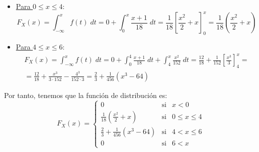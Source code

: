 \begin{ejercicio}
\begin{itemize}
        \item \underline{Para $0\leq x\leq 4$}:
        \begin{equation*}
            F_X(x) = \int_{-\infty}^x f(t)\;dt = 0 +\int_{0}^x \frac{x+1}{18}\;dt = \frac{1}{18}\left[\frac{x^2}{2}+x\right]_0^x
            = \frac{1}{18}\left(\frac{x^2}{2}+x\right)
        \end{equation*}

        \item \underline{Para $4\leq x\leq 6$}:
        \begin{multline*}
            F_X(x) = \int_{-\infty}^x f(t)\;dt = 0 +\int_{0}^4 \frac{x+1}{18}\;dt + 
            \int_{4}^x \frac{x^2}{152}\;dt
            = \frac{12}{18} + \frac{1}{152} \left[\frac{x^3}{3}\right]_4^x
            =\\= \frac{12}{18} + \frac{x^3}{3\cdot 152} - \frac{4^3}{152\cdot 3}
            = \frac{2}{3} + \frac{1}{456}\left(x^3-64\right)
        \end{multline*}
    \end{itemize}
    
    Por tanto, tenemos que la función de distribución es:
    \begin{equation*}
        F_X(x) = \left\{\begin{array}{lll}
            0 & \text{si} & x<0 \\
            \displaystyle  \frac{1}{18}\left(\frac{x^2}{2}+x\right) & \text{si} & 0\leq x \leq 4 \\
            \displaystyle \frac{2}{3} + \frac{1}{456}\left(x^3-64\right) & \text{si} & 4<x\leq 6 \\
            0 & \text{si} & 6<x
        \end{array}\right.
    \end{equation*}
\end{ejercicio}


